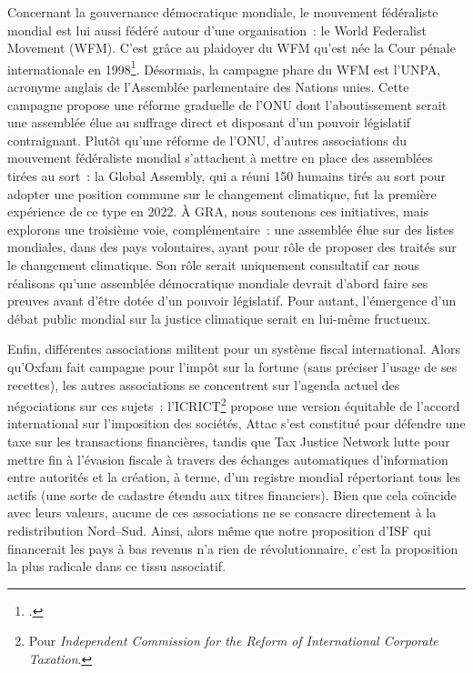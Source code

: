 \documentclass[a5paper,french,openany]{memoir}
\begin{document}
Concernant la gouvernance démocratique mondiale, le mouvement fédéraliste mondial est lui aussi fédéré autour d'une organisation~: le World Federalist Movement (WFM). C'est grâce au plaidoyer du WFM qu'est née la Cour pénale internationale en 1998\footnote{\cite{schiff_building_2008}.}. 
Désormais, la campagne phare du WFM est l'UNPA, acronyme anglais de l'Assemblée parlementaire des Nations unies. Cette campagne propose une réforme graduelle de l'ONU dont l'aboutissement serait une assemblée élue au suffrage direct et disposant d'un pouvoir législatif contraignant. Plutôt qu'une réforme de l'ONU, d'autres associations du mouvement fédéraliste mondial s'attachent à mettre en place des assemblées tirées au sort~: la Global Assembly, qui a réuni 150 humains tirés au sort pour adopter une position commune sur le changement climatique, fut la première expérience de ce type en 2022. 
À GRA, nous soutenons ces initiatives, mais explorons une troisième voie, complémentaire~: 
une assemblée élue sur des listes mondiales, dans des pays volontaires, ayant pour rôle de proposer des traités sur le changement climatique. 
Son rôle serait uniquement consultatif car nous réalisons qu'une assemblée démocratique mondiale devrait d'abord faire ses preuves avant d'être dotée d'un pouvoir législatif. Pour autant, l'émergence d'un débat public mondial sur la justice climatique serait en lui-même fructueux. 

Enfin, différentes associations militent pour un système fiscal international. Alors qu'Oxfam fait campagne pour l'impôt sur la fortune (sans préciser l'usage de ses recettes), les autres associations se concentrent sur l'agenda actuel des négociations sur ces sujets~: l'ICRICT\footnote{Pour \textit{Independent Commission for the Reform of International Corporate Taxation}.} 
propose une version équitable de l'accord international sur l'imposition des sociétés, Attac s'est constitué pour défendre une taxe sur les transactions financières, tandis que Tax Justice Network lutte pour mettre fin à l'évasion fiscale à travers des échanges automatiques d'information entre autorités et la création, à terme, d'un registre mondial répertoriant tous les actifs (une sorte de cadastre étendu aux titres financiers). Bien que cela coïncide avec leurs valeurs, aucune de ces associations ne se consacre directement à la redistribution Nord--Sud. Ainsi, alors même que notre proposition d'ISF qui financerait les pays à bas revenus n'a rien de révolutionnaire, c'est la proposition la plus radicale dans ce tissu associatif. 
\end{document}

